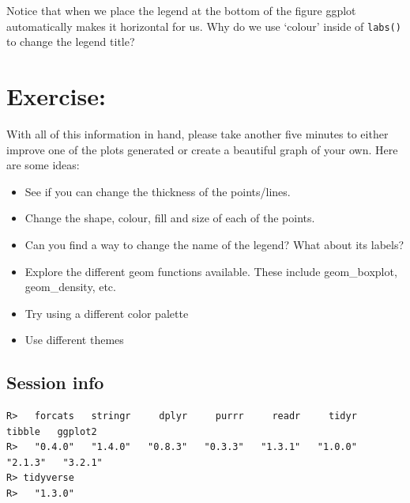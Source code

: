 \documentclass[
]{book}
\newenvironment{Shaded}{\begin{snugshade}}{\end{snugshade}}
\newcommand{\KeywordTok}[1]{\textcolor[rgb]{0.13,0.29,0.53}{\textbf{#1}}}
\newcommand{\NormalTok}[1]{#1}
\newcommand{\OperatorTok}[1]{\textcolor[rgb]{0.81,0.36,0.00}{\textbf{#1}}}
\newcommand{\StringTok}[1]{\textcolor[rgb]{0.31,0.60,0.02}{#1}}
\providecommand{\tightlist}{%
  \setlength{\itemsep}{0pt}\setlength{\parskip}{0pt}}
\begin{document}
Notice that when we place the legend at the bottom of the figure ggplot automatically makes it horizontal for us. Why do we use `colour' inside of \texttt{labs()} to change the legend title?

\hypertarget{exercise-3}{%
\chapter{Exercise:}\label{exercise-3}}

With all of this information in hand, please take another five minutes to either improve one of the plots generated or create a beautiful graph of your own. Here are some ideas:

\begin{itemize}
\tightlist
\item
  See if you can change the thickness of the points/lines.
\item
  Change the shape, colour, fill and size of each of the points.
\item
  Can you find a way to change the name of the legend? What about its labels?
\item
  Explore the different geom functions available. These include geom\_boxplot, geom\_density, etc.
\item
  Try using a different color palette
\item
  Use different themes
\end{itemize}

\hypertarget{session-info-3}{%
\section{Session info}\label{session-info-3}}

\begin{Shaded}
\end{Shaded}

\begin{verbatim}
R>   forcats   stringr     dplyr     purrr     readr     tidyr    tibble   ggplot2 
R>   "0.4.0"   "1.4.0"   "0.8.3"   "0.3.3"   "1.3.1"   "1.0.0"   "2.1.3"   "3.2.1" 
R> tidyverse 
R>   "1.3.0"
\end{verbatim}
\end{document}
